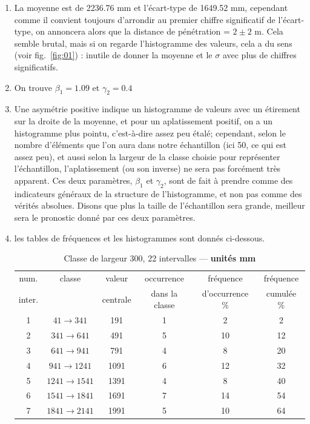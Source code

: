 \begin{enumerate}%
\item La moyenne est de 2236.76 mm et l'écart-type de 1649.52 mm, cependant comme il convient toujours d'arrondir au premier chiffre significatif de l'écart-type, on annoncera alors que la distance de pénétration = $2\pm 2$ m. Cela semble brutal, mais si on regarde l'histogramme des valeurs, cela a du sens (voir fig.~\ref{fig:01}) : inutile de donner la moyenne et le $\sigma$ avec plus de chiffres significatifs.
\item On trouve $\beta_1=1.09$ et $\gamma_2=0.4$
\item Une asymétrie positive indique un histogramme de valeurs avec un étirement sur la droite de la moyenne, et pour un aplatissement positif, on a un histogramme plus pointu, c'est-à-dire assez peu étalé; cependant, selon le nombre d'éléments que l'on aura dans notre échantillon (ici 50, ce qui est assez peu), et aussi selon la largeur de la classe choisie pour représenter l'échantillon, l'aplatissement (ou son inverse) ne sera pas forcément très apparent. Ces deux paramètres, $\beta_1$ et $\gamma_2$, sont de fait à prendre comme des indicateurs généraux de la structure de l'histogramme, et non pas comme des vérités absolues. Disons que plus la taille de l'échantillon sera grande, meilleur sera le pronostic donné par ces deux paramètres.
\item les tables de fréquences et les histogrammes sont donnés ci-dessous.
\begin{table}[htdp]
\caption{Classe de largeur 300, 22 intervalles --- \textbf{unités mm}}
\begin{center}
\begin{tabular}{cccccc}
\hline
num. & classe & valeur & occurrence & fréquence & fréquence\\
inter. &  & centrale & dans la classe & d'occurrence \% & cumulée \%\\\hline
 1 & $  41 \rightarrow  341$ &  191 & 1 &  2 &   2\\
 2 & $ 341 \rightarrow  641$ &  491 & 5 & 10 &  12\\
 3 & $ 641 \rightarrow  941$ &  791 & 4 &  8 &  20\\
 4 & $ 941 \rightarrow 1241$ & 1091 & 6 & 12 &  32\\
 5 & $1241 \rightarrow 1541$ & 1391 & 4 &  8 &  40\\
 6 & $1541 \rightarrow 1841$ & 1691 & 7 & 14 &  54\\
 7 & $1841 \rightarrow 2141$ & 1991 & 5 & 10 &  64\\

\end{tabular}
\end{center}
\end{table}
\end{enumerate}
